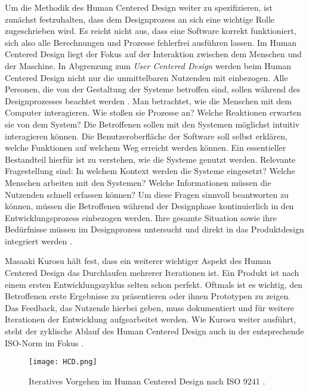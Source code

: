 Um die Methodik des Human Centered Design weiter zu spezifizieren, ist zunächst
festzuhalten, dass dem Designprozess an sich eine wichtige Rolle zugeschrieben
wird. Es reicht nicht aus, dass eine Software korrekt funktioniert, sich also
alle Berechnungen und Prozesse fehlerfrei ausführen lassen. Im Human Centered
Design liegt der Fokus auf der Interaktion zwischen dem Menschen und der
Maschine. In Abgrenzung zum \textit{User Centered Design} werden beim Human
Centered Design nicht nur die unmittelbaren Nutzenden mit einbezogen. Alle
Personen, die von der Gestaltung der Systeme betroffen sind, sollen während des
Designprozesses beachtet werden \cite{sequenceDiagrams}. Man betrachtet, wie die
Menschen mit dem Computer interagieren. Wie stoßen sie Prozesse an? Welche
Reaktionen erwarten sie von dem System? Die Betroffenen sollen mit den Systemen
möglichst intuitiv interagieren können. Die Benutzeroberfläche der Software
soll selbst erklären, welche Funktionen auf welchem Weg erreicht werden können.
Ein essentieller Bestandteil hierfür ist zu verstehen, wie die Systeme genutzt
werden. Relevante Fragestellung sind: In welchem Kontext werden die
Systeme eingesetzt? Welche Menschen arbeiten mit den Systemen? Welche
Informationen müssen die Nutzenden schnell erfassen können? Um diese Fragen
sinnvoll beantworten zu können, müssen die Betroffenen während der Designphase
kontinuierlich in den Entwicklungsprozess einbezogen werden. Ihre gesamte
Situation sowie ihre Bedürfnisse müssen im Designprozess untersucht und direkt
in das Produktdesign integriert werden \cite{hci}.

Masaaki Kurosu hält fest, dass ein weiterer wichtiger Aspekt des Human Centered
Design das Durchlaufen mehrerer Iterationen ist. Ein Produkt ist nach einem ersten
Entwicklungszyklus selten schon perfekt. Oftmals ist es wichtig, den Betroffenen
erste Ergebnisse zu präsentieren oder ihnen Prototypen zu zeigen. Das Feedback,
das Nutzende hierbei geben, muss dokumentiert und für weitere Iterationen der
Entwicklung aufgearbeitet werden. Wie Kurosu weiter ausführt, steht der
zyklische Ablauf des Human Centered Design auch in der entsprechende ISO-Norm
im Fokus \cite{kurosuHCI}.

\begin{figure}[H]
    \caption{Iteratives Vorgehen im Human Centered Design nach ISO 9241  \cite{ISO9241Graphic}.}
    \label{fig:iso-diagram}
    \centering
    \texttt{[image: HCD.png]}
\end{figure}

